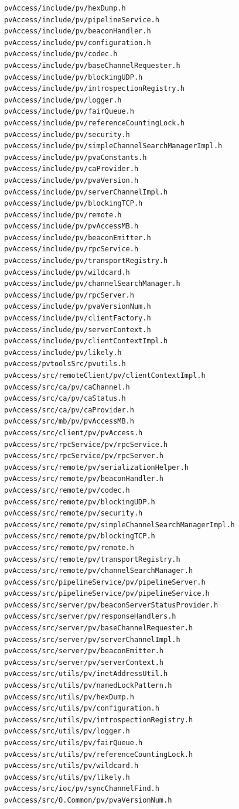 \documentclass[11pt
  , a4paper
  , article
  , oneside
]{memoir}
\begin{document}
\begin{lstlisting}[style=termstylenumber, caption={Code List}, label={list:nfsroot-file}]
pvAccess/include/pv/hexDump.h
pvAccess/include/pv/pipelineService.h
pvAccess/include/pv/beaconHandler.h
pvAccess/include/pv/configuration.h
pvAccess/include/pv/codec.h
pvAccess/include/pv/baseChannelRequester.h
pvAccess/include/pv/blockingUDP.h
pvAccess/include/pv/introspectionRegistry.h
pvAccess/include/pv/logger.h
pvAccess/include/pv/fairQueue.h
pvAccess/include/pv/referenceCountingLock.h
pvAccess/include/pv/security.h
pvAccess/include/pv/simpleChannelSearchManagerImpl.h
pvAccess/include/pv/pvaConstants.h
pvAccess/include/pv/caProvider.h
pvAccess/include/pv/pvaVersion.h
pvAccess/include/pv/serverChannelImpl.h
pvAccess/include/pv/blockingTCP.h
pvAccess/include/pv/remote.h
pvAccess/include/pv/pvAccessMB.h
pvAccess/include/pv/beaconEmitter.h
pvAccess/include/pv/rpcService.h
pvAccess/include/pv/transportRegistry.h
pvAccess/include/pv/wildcard.h
pvAccess/include/pv/channelSearchManager.h
pvAccess/include/pv/rpcServer.h
pvAccess/include/pv/pvaVersionNum.h
pvAccess/include/pv/clientFactory.h
pvAccess/include/pv/serverContext.h
pvAccess/include/pv/clientContextImpl.h
pvAccess/include/pv/likely.h
pvAccess/pvtoolsSrc/pvutils.h
pvAccess/src/remoteClient/pv/clientContextImpl.h
pvAccess/src/ca/pv/caChannel.h
pvAccess/src/ca/pv/caStatus.h
pvAccess/src/ca/pv/caProvider.h
pvAccess/src/mb/pv/pvAccessMB.h
pvAccess/src/client/pv/pvAccess.h
pvAccess/src/rpcService/pv/rpcService.h
pvAccess/src/rpcService/pv/rpcServer.h
pvAccess/src/remote/pv/serializationHelper.h
pvAccess/src/remote/pv/beaconHandler.h
pvAccess/src/remote/pv/codec.h
pvAccess/src/remote/pv/blockingUDP.h
pvAccess/src/remote/pv/security.h
pvAccess/src/remote/pv/simpleChannelSearchManagerImpl.h
pvAccess/src/remote/pv/blockingTCP.h
pvAccess/src/remote/pv/remote.h
pvAccess/src/remote/pv/transportRegistry.h
pvAccess/src/remote/pv/channelSearchManager.h
pvAccess/src/pipelineService/pv/pipelineServer.h
pvAccess/src/pipelineService/pv/pipelineService.h
pvAccess/src/server/pv/beaconServerStatusProvider.h
pvAccess/src/server/pv/responseHandlers.h
pvAccess/src/server/pv/baseChannelRequester.h
pvAccess/src/server/pv/serverChannelImpl.h
pvAccess/src/server/pv/beaconEmitter.h
pvAccess/src/server/pv/serverContext.h
pvAccess/src/utils/pv/inetAddressUtil.h
pvAccess/src/utils/pv/namedLockPattern.h
pvAccess/src/utils/pv/hexDump.h
pvAccess/src/utils/pv/configuration.h
pvAccess/src/utils/pv/introspectionRegistry.h
pvAccess/src/utils/pv/logger.h
pvAccess/src/utils/pv/fairQueue.h
pvAccess/src/utils/pv/referenceCountingLock.h
pvAccess/src/utils/pv/wildcard.h
pvAccess/src/utils/pv/likely.h
pvAccess/src/ioc/pv/syncChannelFind.h
pvAccess/src/O.Common/pv/pvaVersionNum.h

\end{lstlisting}
\end{document}
